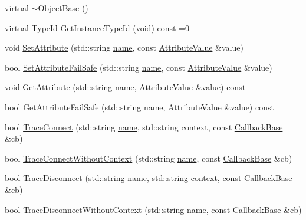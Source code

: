 \begin{DoxyCompactItemize}
\item 
virtual \hyperlink{classns3_1_1ObjectBase_a7220e67cb81669e3cd42056ece067aa6}{$\sim$\+Object\+Base} ()
\item 
virtual \hyperlink{classns3_1_1TypeId}{Type\+Id} \hyperlink{classns3_1_1ObjectBase_abe5b43a6f5b99a92a4c3122db31f06fb}{Get\+Instance\+Type\+Id} (void) const =0
\item 
void \hyperlink{classns3_1_1ObjectBase_ac60245d3ea4123bbc9b1d391f1f6592f}{Set\+Attribute} (std\+::string \hyperlink{generate__test__data__lte__spectrum__model_8m_ab74e6bf80237ddc4109968cedc58c151}{name}, const \hyperlink{classns3_1_1AttributeValue}{Attribute\+Value} \&value)
\item 
bool \hyperlink{classns3_1_1ObjectBase_aa7d333004e970f925a4ed5df275541b5}{Set\+Attribute\+Fail\+Safe} (std\+::string \hyperlink{generate__test__data__lte__spectrum__model_8m_ab74e6bf80237ddc4109968cedc58c151}{name}, const \hyperlink{classns3_1_1AttributeValue}{Attribute\+Value} \&value)
\item 
void \hyperlink{classns3_1_1ObjectBase_a895d1de2f96063d0e0fd78463e7a7e30}{Get\+Attribute} (std\+::string \hyperlink{generate__test__data__lte__spectrum__model_8m_ab74e6bf80237ddc4109968cedc58c151}{name}, \hyperlink{classns3_1_1AttributeValue}{Attribute\+Value} \&value) const 
\item 
bool \hyperlink{classns3_1_1ObjectBase_a3fdec0e0ebed2c251c3a17ba6ba787da}{Get\+Attribute\+Fail\+Safe} (std\+::string \hyperlink{generate__test__data__lte__spectrum__model_8m_ab74e6bf80237ddc4109968cedc58c151}{name}, \hyperlink{classns3_1_1AttributeValue}{Attribute\+Value} \&value) const 
\item 
bool \hyperlink{classns3_1_1ObjectBase_ada3a45b34bc23114a25e0ab19188276e}{Trace\+Connect} (std\+::string \hyperlink{generate__test__data__lte__spectrum__model_8m_ab74e6bf80237ddc4109968cedc58c151}{name}, std\+::string context, const \hyperlink{classns3_1_1CallbackBase}{Callback\+Base} \&cb)
\item 
bool \hyperlink{classns3_1_1ObjectBase_a1be45f6fd561e75dcac9dfa81b2b81e4}{Trace\+Connect\+Without\+Context} (std\+::string \hyperlink{generate__test__data__lte__spectrum__model_8m_ab74e6bf80237ddc4109968cedc58c151}{name}, const \hyperlink{classns3_1_1CallbackBase}{Callback\+Base} \&cb)
\item 
bool \hyperlink{classns3_1_1ObjectBase_a1d0a860c9c786d06cf139be632d1b49b}{Trace\+Disconnect} (std\+::string \hyperlink{generate__test__data__lte__spectrum__model_8m_ab74e6bf80237ddc4109968cedc58c151}{name}, std\+::string context, const \hyperlink{classns3_1_1CallbackBase}{Callback\+Base} \&cb)
\item 
bool \hyperlink{classns3_1_1ObjectBase_a460d74131ef97d9d7ba79c6d70b2f304}{Trace\+Disconnect\+Without\+Context} (std\+::string \hyperlink{generate__test__data__lte__spectrum__model_8m_ab74e6bf80237ddc4109968cedc58c151}{name}, const \hyperlink{classns3_1_1CallbackBase}{Callback\+Base} \&cb)
\end{DoxyCompactItemize}
